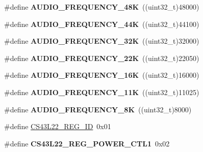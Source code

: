 \begin{DoxyCompactItemize}
\#define {\bfseries A\+U\+D\+I\+O\+\_\+\+F\+R\+E\+Q\+U\+E\+N\+C\+Y\+\_\+48K}~((uint32\+\_\+t)48000)
\item 
\mbox{\label{group___c_s43_l22___exported___constants_ga91347c0bc8d69163de650e39566f4cf9}} 
\#define {\bfseries A\+U\+D\+I\+O\+\_\+\+F\+R\+E\+Q\+U\+E\+N\+C\+Y\+\_\+44K}~((uint32\+\_\+t)44100)
\item 
\mbox{\label{group___c_s43_l22___exported___constants_ga82c1a9ebdb5fff7cec9e07f82c4e5321}} 
\#define {\bfseries A\+U\+D\+I\+O\+\_\+\+F\+R\+E\+Q\+U\+E\+N\+C\+Y\+\_\+32K}~((uint32\+\_\+t)32000)
\item 
\mbox{\label{group___c_s43_l22___exported___constants_ga5d5dd060dd36a34a6ecfe4c0b64ed7f6}} 
\#define {\bfseries A\+U\+D\+I\+O\+\_\+\+F\+R\+E\+Q\+U\+E\+N\+C\+Y\+\_\+22K}~((uint32\+\_\+t)22050)
\item 
\mbox{\label{group___c_s43_l22___exported___constants_ga150a46b30e7518c0cb40bd0841eab31a}} 
\#define {\bfseries A\+U\+D\+I\+O\+\_\+\+F\+R\+E\+Q\+U\+E\+N\+C\+Y\+\_\+16K}~((uint32\+\_\+t)16000)
\item 
\mbox{\label{group___c_s43_l22___exported___constants_gaac1df26c4282f25927923d1c13f96611}} 
\#define {\bfseries A\+U\+D\+I\+O\+\_\+\+F\+R\+E\+Q\+U\+E\+N\+C\+Y\+\_\+11K}~((uint32\+\_\+t)11025)
\item 
\mbox{\label{group___c_s43_l22___exported___constants_gac4ebc1b9e38f03b6e45f2d35598d85dd}} 
\#define {\bfseries A\+U\+D\+I\+O\+\_\+\+F\+R\+E\+Q\+U\+E\+N\+C\+Y\+\_\+8K}~((uint32\+\_\+t)8000)
\item 
\#define \mbox{\hyperlink{group___c_s43_l22___exported___constants_gafa115e312c746a49650c05b865741556}{C\+S43\+L22\+\_\+\+R\+E\+G\+\_\+\+ID}}~0x01
\item 
\mbox{\label{group___c_s43_l22___exported___constants_ga4a07521e00b4ad4dee48b3ee5dc6c10d}} 
\#define {\bfseries C\+S43\+L22\+\_\+\+R\+E\+G\+\_\+\+P\+O\+W\+E\+R\+\_\+\+C\+T\+L1}~0x02
\item 

\end{DoxyCompactItemize}
